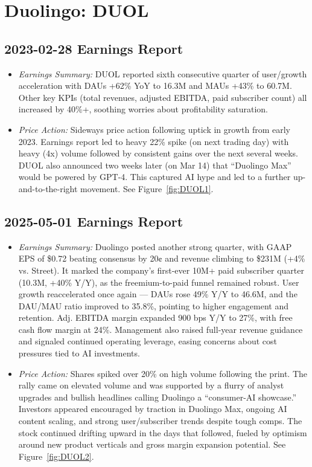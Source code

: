 \documentclass[11pt]{article}
\begin{document}
\section{Duolingo: DUOL}
    \subsection{2023-02-28 Earnings Report}
        \begin{itemize}
            \item \textit{Earnings Summary:} DUOL reported sixth consecutive quarter of user/growth acceleration with DAUs +62\% YoY to 16.3M and MAUs +43\% to 60.7M. Other key KPIs (total revenues, adjusted EBITDA, paid subscriber count) all increased by 40\%+, soothing worries about profitability saturation.
            \item \textit{Price Action:} Sideways price action following uptick in growth from early 2023. Earnings report led to heavy 22\% spike (on next trading day) with heavy (4x) volume followed by consistent gains over the next several weeks. DUOL also announced two weeks later (on Mar 14) that ``Duolingo Max'' would be powered by GPT-4. This captured AI hype and led to a further up-and-to-the-right movement. See Figure~\ref{fig:DUOL1}.
        \end{itemize}
    \subsection{2025-05-01 Earnings Report}
        \begin{itemize}
            \item \textit{Earnings Summary:} Duolingo posted another strong quarter, with GAAP EPS of \$0.72 beating consensus by 20¢ and revenue climbing to \$231M (+4\% vs. Street). It marked the company’s first-ever 10M+ paid subscriber quarter (10.3M, +40\% Y/Y), as the freemium-to-paid funnel remained robust. User growth reaccelerated once again — DAUs rose 49\% Y/Y to 46.6M, and the DAU/MAU ratio improved to 35.8\%, pointing to higher engagement and retention. Adj. EBITDA margin expanded 900 bps Y/Y to 27\%, with free cash flow margin at 24\%. Management also raised full-year revenue guidance and signaled continued operating leverage, easing concerns about cost pressures tied to AI investments.
            \item \textit{Price Action:} Shares spiked over 20\% on high volume following the print. The rally came on elevated volume and was supported by a flurry of analyst upgrades and bullish headlines calling Duolingo a “consumer-AI showcase.” Investors appeared encouraged by traction in Duolingo Max, ongoing AI content scaling, and strong user/subscriber trends despite tough comps. The stock continued drifting upward in the days that followed, fueled by optimism around new product verticals and gross margin expansion potential. See Figure~\ref{fig:DUOL2}.
        \end{itemize}
\end{document}
